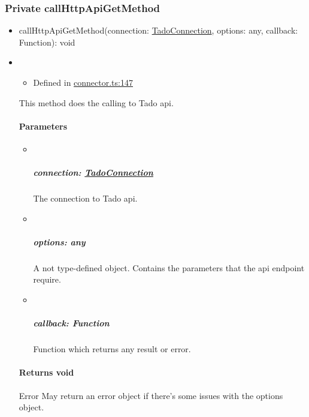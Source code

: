 \documentclass[]{article}
\providecommand{\tightlist}{%
  \setlength{\itemsep}{0pt}\setlength{\parskip}{0pt}}
\let\oldparagraph\paragraph
\renewcommand{\paragraph}[1]{\oldparagraph{#1}\mbox{}}
\let\oldsubparagraph\subparagraph
\renewcommand{\subparagraph}[1]{\oldsubparagraph{#1}\mbox{}}
\begin{document}
\protect\hypertarget{callhttpapigetmethod}{}{}

\hypertarget{private-callhttpapigetmethod}{%
\subsubsection{\texorpdfstring{{Private}
callHttpApiGetMethod}{Private callHttpApiGetMethod}}\label{private-callhttpapigetmethod}}

\begin{itemize}
\tightlist
\item
  callHttpApiGetMethod{(}connection{:
  }\href{_connector_.tadoconnection.html}{TadoConnection}, options{:
  }{any}, callback{: }{Function}{)}{: }{void}
\end{itemize}

\begin{itemize}
\item
  \begin{itemize}
  \tightlist
  \item
    Defined in
    \href{https://github.com/BFMBFramework/TadoConnector/blob/f05932b/src/connector.ts\#L147}{connector.ts:147}
  \end{itemize}

  This method does the calling to Tado api.

  \hypertarget{parameters-1}{%
  \paragraph{Parameters}\label{parameters-1}}

  \begin{itemize}
  \item ~
    \hypertarget{connection-tadoconnection}{%
    \subparagraph{\texorpdfstring{connection:
    \href{_connector_.tadoconnection.html}{TadoConnection}}{connection: TadoConnection}}\label{connection-tadoconnection}}

    The connection to Tado api.
  \item ~
    \hypertarget{options-any-1}{%
    \subparagraph{\texorpdfstring{options:
    {any}}{options: any}}\label{options-any-1}}

    A not type-defined object. Contains the parameters that the api
    endpoint require.
  \item ~
    \hypertarget{callback-function-1}{%
    \subparagraph{\texorpdfstring{callback:
    {Function}}{callback: Function}}\label{callback-function-1}}

    Function which returns any result or error.
  \end{itemize}

  \hypertarget{returns-void-1}{%
  \paragraph{\texorpdfstring{Returns
  {void}}{Returns void}}\label{returns-void-1}}

  Error May return an error object if there's some issues with the
  options object.
\end{itemize}
\end{document}
